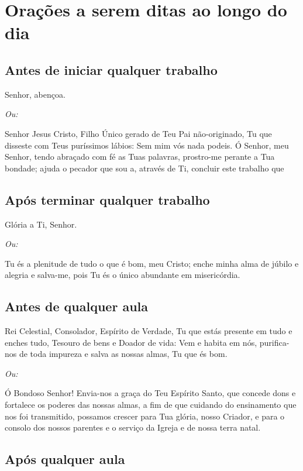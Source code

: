 \documentclass{subfiles}
\begin{document}
\chapter{Orações a serem ditas ao longo do dia}

\section*{Antes de iniciar qualquer trabalho}

Senhor, abençoa.

\textit{Ou:}

Senhor Jesus Cristo, Filho Único gerado de Teu Pai não-originado, Tu que 
disseste com Teus puríssimos lábios: Sem mim vós nada podeis. Ó Senhor, meu 
Senhor, tendo abraçado com fé as Tuas palavras, prostro-me perante a Tua 
bondade; ajuda o pecador que sou a, através de Ti, concluir este trabalho que 

\section*{Após terminar qualquer trabalho}

Glória a Ti, Senhor.

\textit{Ou:}

Tu és a plenitude de tudo o que é bom, meu Cristo; enche minha alma de júbilo 
e alegria e salva-me, pois Tu és o único abundante em misericórdia. 

 
\section*{Antes de qualquer aula} 

Rei Celestial, Consolador, Espírito de Verdade, Tu que estás presente em tudo 
e enches tudo, Tesouro de bens e Doador de vida: Vem e habita em nós,
purifica-nos de toda impureza e salva as nossas almas, Tu que és bom. 

\textit{Ou:}

Ó Bondoso Senhor! Envia-nos a graça do Teu Espírito Santo, que concede dons e
fortalece os poderes das nossas almas, a fim de que cuidando do ensinamento que
nos foi transmitido, possamos crescer para Tua glória, nosso Criador, e para o
consolo dos nossos parentes e o serviço da Igreja e de nossa terra natal.

\section*{Após qualquer aula}
\end{document}

